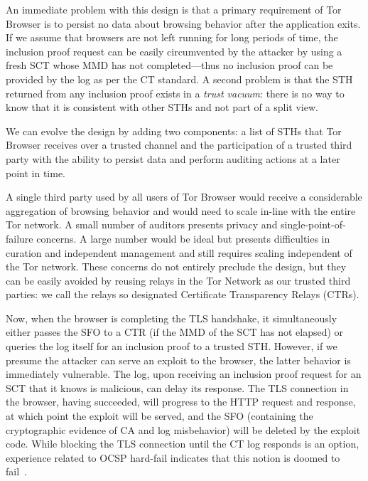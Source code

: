 An immediate problem with this design is that a primary requirement of Tor
Browser is to persist no data about browsing behavior after the application
exits. If we assume that browsers are not left running for long periods of time,
the inclusion proof request can be easily circumvented by the attacker by using
a fresh SCT whose MMD has not completed---thus no inclusion proof can be
provided by the log as per the CT standard. A second problem is that the STH
returned from any inclusion proof exists in a \emph{trust vacuum}: there is no
way to know that it is consistent with other STHs and not part of a split view.

We can evolve the design by adding two components: a list of STHs that Tor
Browser receives over a trusted channel and the participation of a trusted third
party with the ability to persist data and perform auditing actions at a later
point in time.

A single third party used by all users of Tor Browser would receive a
considerable aggregation of browsing behavior and would need to scale in-line
with the entire Tor network. A small number of auditors presents privacy and
single-point-of-failure concerns. A large number would be ideal but presents
difficulties in curation and independent management and still requires scaling
independent of the Tor network. These concerns do not entirely preclude the
design, but they can be easily avoided by reusing relays in the Tor Network as
our trusted third parties: we call the relays so designated Certificate
Transparency Relays (CTRs).

Now, when the browser is completing the TLS handshake, it simultaneously either
passes the SFO to a CTR (if the MMD of the SCT has not elapsed) or queries the
log itself for an inclusion proof to a trusted STH\@.  However, if we presume
the attacker can serve an exploit to the browser, the latter behavior is
immediately vulnerable. The log, upon receiving an inclusion proof request for
an SCT that it knows is malicious, can delay its response. The TLS connection in
the browser, having succeeded, will progress to the HTTP request and response,
at which point the exploit will be served, and the SFO (containing the
cryptographic evidence of CA and log misbehavior) will be deleted by the exploit
code. While blocking the TLS connection until the CT log responds is an option,
experience related to OCSP hard-fail indicates that this notion is doomed to
fail~\cite{no-hard-fail}.

